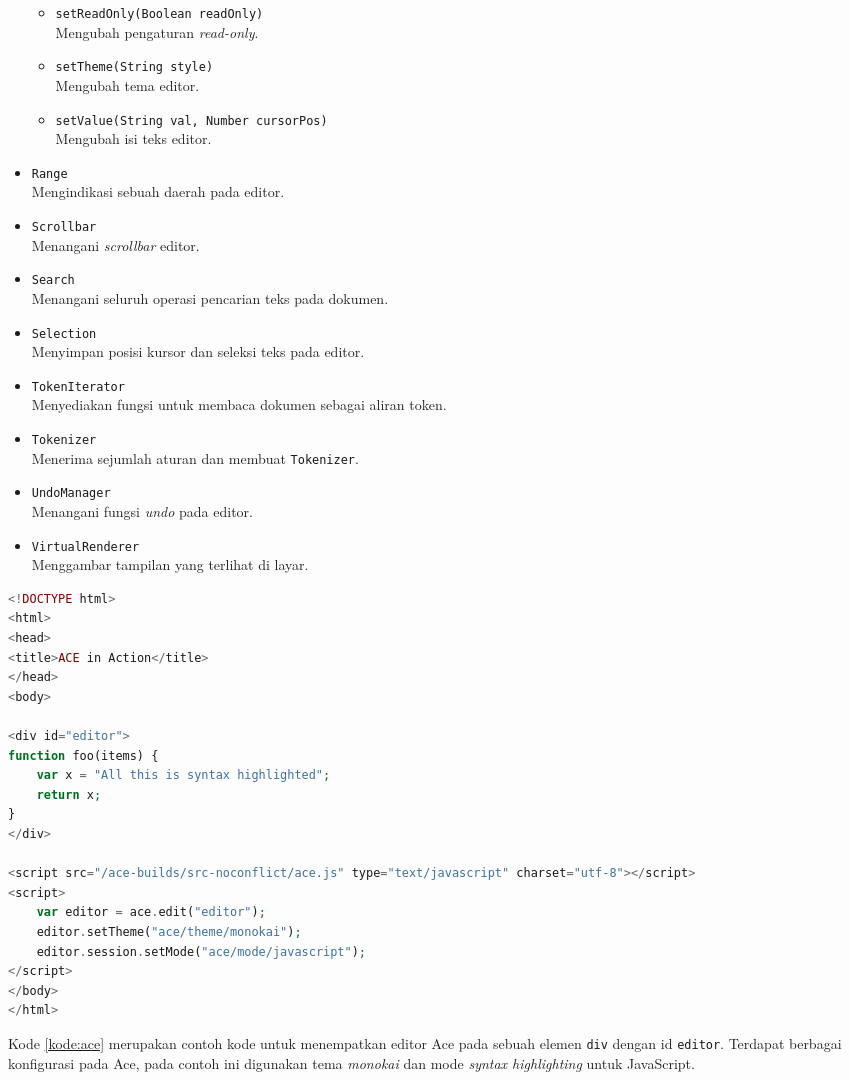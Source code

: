 \begin{itemize}
\begin{itemize}
            \item \verb|setReadOnly(Boolean readOnly)| \\ Mengubah pengaturan \textit{read-only}.
            \item \verb|setTheme(String style)| \\ Mengubah tema editor.
            \item \verb|setValue(String val, Number cursorPos)| \\ Mengubah isi teks editor.
        \end{itemize}
    \item \verb|Range| \\ Mengindikasi sebuah daerah pada editor.
    \item \verb|Scrollbar| \\ Menangani \textit{scrollbar} editor.
    \item \verb|Search| \\ Menangani seluruh operasi pencarian teks pada dokumen.
    \item \verb|Selection| \\ Menyimpan posisi kursor dan seleksi teks pada editor.
    \item \verb|TokenIterator| \\ Menyediakan fungsi untuk membaca dokumen sebagai aliran token.
    \item \verb|Tokenizer| \\ Menerima sejumlah aturan dan membuat \verb|Tokenizer|.
    \item \verb|UndoManager| \\ Menangani fungsi \textit{undo} pada editor.
    \item \verb|VirtualRenderer| \\ Menggambar tampilan yang terlihat di layar.
\end{itemize}


\begin{lstlisting}[language=php, caption=Contoh kode untuk menggunakan Ace, label=kode:ace]
<!DOCTYPE html>
<html>
<head>
<title>ACE in Action</title>
</head>
<body>

<div id="editor">
function foo(items) {
    var x = "All this is syntax highlighted";
    return x;
}
</div>
    
<script src="/ace-builds/src-noconflict/ace.js" type="text/javascript" charset="utf-8"></script>
<script>
    var editor = ace.edit("editor");
    editor.setTheme("ace/theme/monokai");
    editor.session.setMode("ace/mode/javascript");
</script>
</body>
</html>
\end{lstlisting} 

Kode \ref{kode:ace} merupakan contoh kode untuk menempatkan editor Ace pada sebuah elemen \verb|div| dengan id \verb|editor|. Terdapat berbagai konfigurasi pada Ace, pada contoh ini digunakan tema \textit{monokai} dan mode \textit{syntax highlighting} untuk JavaScript.




